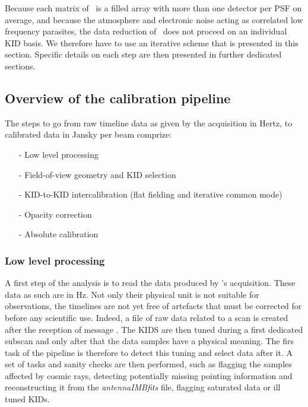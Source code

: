 
Because each matrix of \nika\ is a filled array with more than one detector per
PSF on average, and because the atmosphere and electronic noise acting as
correlated low frequency parasites, the data reduction of \nika\ does not
proceed on an individual KID basis. We therefore have to use an iterative scheme
that is presented in this section. Specific details on each step are then
presented in further dedicated sections.

\subsection{Overview of the calibration pipeline}

The steps to go from raw timeline data as given by the acquisition in Hertz, to
calibrated data in Jansky per beam comprize:

\begin{itemize}
\item[-] Low level processing
\item[-] Field-of-view geometry and KID selection
\item[-] KID-to-KID intercalibration (flat fielding and iterative common mode)
\item[-] Opacity correction
\item[-] Absolute calibration
\end{itemize}

\subsubsection{Low level processing}

A first step of the analysis is to read the data produced by \nika's
acquisition. These data as such are in Hz. Not only their physical unit is not
suitable for observations, the timelines are not yet free of artefacts that must
be corrected for before any scientific use. Indeed, a file of raw data related
to a scan is created after the reception of message . The KIDS are then tuned during a first
dedicated subscan and only after that the data samples have a physical
meaning. The firs task of the pipeline is therefore to detect this tuning and
select data after it. A set of tasks and sanity checks are then performed, such
as flagging the samples affected by cosmic rays, detecting potentially missing
pointing information and reconstructing it from the \emph{antennaIMBfits} file,
flagging saturated data or ill tuned KIDs.\\

